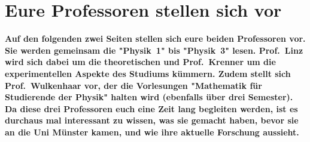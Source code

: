 \section[Eure Profs stellen sich vor]{Eure Professoren stellen sich vor}
\textbf{Auf den folgenden zwei Seiten stellen sich eure beiden Professoren vor.
    Sie werden gemeinsam die "Physik~1" bis "Physik~3" lesen.
    Prof.\ Linz wird sich dabei um die theoretischen und Prof.\ Krenner um die experimentellen Aspekte des Studiums kümmern.
    Zudem stellt sich Prof.\ Wulkenhaar vor, der die Vorlesungen "Mathematik für Studierende der Physik" halten wird (ebenfalls über drei Semester).
	Da diese drei Professoren euch eine Zeit lang begleiten werden, ist es durchaus mal interessant zu wissen, was sie gemacht haben, bevor sie an die Uni Münster kamen, und wie ihre aktuelle Forschung aussieht.}

